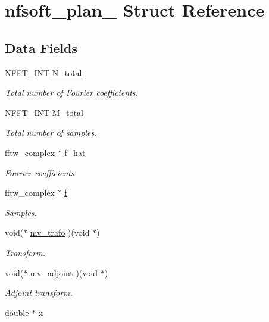 \hypertarget{structnfsoft__plan__}{\section{nfsoft\-\_\-plan\-\_\- Struct Reference}
\label{structnfsoft__plan__}
}
\subsection*{Data Fields}
\begin{DoxyCompactItemize}
\item 
N\-F\-F\-T\-\_\-\-I\-N\-T \hyperlink{structnfsoft__plan___a1a87be12611ae7fc95df3b21f8d4e762}{N\-\_\-total}
\begin{DoxyCompactList}\small\item\em Total number of Fourier coefficients. \end{DoxyCompactList}\item 
N\-F\-F\-T\-\_\-\-I\-N\-T \hyperlink{structnfsoft__plan___aba4e9aec0273d65dfb761cb51ada2053}{M\-\_\-total}
\begin{DoxyCompactList}\small\item\em Total number of samples. \end{DoxyCompactList}\item 
fftw\-\_\-complex $\ast$ \hyperlink{structnfsoft__plan___a941c8dcaeeef8fed4b55c730d8fbdf80}{f\-\_\-hat}
\begin{DoxyCompactList}\small\item\em Fourier coefficients. \end{DoxyCompactList}\item 
fftw\-\_\-complex $\ast$ \hyperlink{structnfsoft__plan___a68290fc4238315c5cfacd4c0a08ee233}{f}
\begin{DoxyCompactList}\small\item\em Samples. \end{DoxyCompactList}\item 
void($\ast$ \hyperlink{structnfsoft__plan___ae7c72bdbce93cb99dcbd14d764d08502}{mv\-\_\-trafo} )(void $\ast$)
\begin{DoxyCompactList}\small\item\em Transform. \end{DoxyCompactList}\item 
void($\ast$ \hyperlink{structnfsoft__plan___a33d5fb830b3021ddb85320139be034b8}{mv\-\_\-adjoint} )(void $\ast$)
\begin{DoxyCompactList}\small\item\em Adjoint transform. \end{DoxyCompactList}\item 
\hypertarget{structnfsoft__plan___af194431b610fd2f9f003dff236398383}{double $\ast$ \hyperlink{structnfsoft__plan___af194431b610fd2f9f003dff236398383}{x}}\label{structnfsoft__plan___af194431b610fd2f9f003dff236398383}


\end{DoxyCompactItemize}
